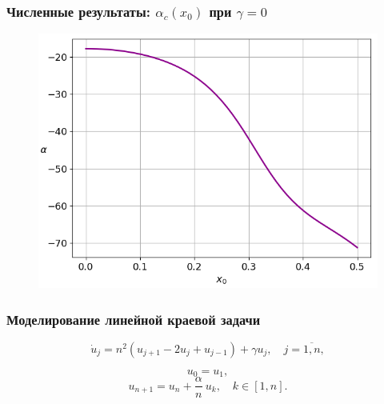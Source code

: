 \documentclass[fullscreen=true, unicode, bookmarks=false]{beamer}
\begin{document}
\begin{frame}
\frametitle{ Численные результаты: $ \alpha_c(x_0) $ при $ \gamma = 0 $ }

\begin{figure} 
\includegraphics[scale=0.65]{origins.png}  
\end{figure}

\end{frame}

\begin{frame}
\frametitle{ Моделирование линейной краевой задачи }

\begin{equation}\label{numeric_problem} 
	\dot{u}_j =  n^2(u_{j+1} - 2u_j + u_{j-1}) + \gamma u_j, \quad j = \overline{1, n}, 
\end{equation}

\vfill

$$ u_0 = u_1, $$
$$ u_{n+1} = u_n + \frac{\alpha}{n}\:u_k, \quad k \in [1,n]. $$

\end{frame}
\end{document}
